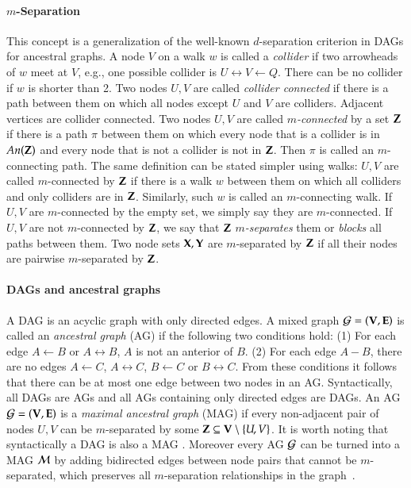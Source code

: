 \paragraph{$m$-Separation} This concept is 
a generalization of the well-known $d$-separation 
criterion in DAGs  \citep{Pearl2009} for ancestral graphs.
A node $V$ on a walk $w$
is called a \emph{collider} if two arrowheads of $w$
meet at $V$, e.g., one possible collider is
$U \leftrightarrow V \gets Q$. There can be no collider
if $w$ is shorter than 2. Two nodes $U,V$ are called
\emph{collider connected} if there is a path between 
them on which all nodes except $U$ and $V$ are 
colliders. Adjacent vertices are collider connected.
Two nodes $U,V$ are 
called \emph{$m$-connected} by a set ${\bf Z}$ if there is a path $\pi$
between them on which every node that is a collider 
is in $\textit{An}({\bf Z})$ and every node that is not a 
collider is not in ${\bf Z}$. Then $\pi$
is called an $m$-connecting path. The same definition
can be stated simpler using walks:
$U,V$ are called $m$-connected by ${\bf Z}$ if 
there is a walk $w$ between them on which all
colliders and only colliders are in ${\bf Z}$.
Similarly, such $w$ is called an $m$-connecting walk.
If $U,V$ are
$m$-connected by the empty set, we simply say they
are $m$-connected.
If $U,V$ are 
not $m$-connected by ${\bf Z}$, we say that ${\bf Z}$ \emph{$m$-separates}
them or \emph{blocks} all paths between them. Two node sets
${\bf X},{\bf Y}$ are $m$-separated by ${\bf Z}$ if all
their nodes are pairwise $m$-separated by ${\bf Z}$.

%
%
%
%
%
%
%
%
%
%
%
%
%
%
%
%
% 


\paragraph{DAGs and ancestral graphs} A DAG is an acyclic graph with only directed  edges.
A mixed graph
${\cal G}=({\bf V},{\bf E})$ is called an \emph{ancestral graph} (AG)  \citep{Richardson2002} if the following two
conditions hold: (1) For each edge $A\gets B$ 
or $A \leftrightarrow B$, $A$ is not an anterior of $B$.
(2) For each edge $A-B$, there are no edges
$A \gets C$, $A \leftrightarrow C$, $B \gets C$ 
or $B \leftrightarrow C$. From these conditions it follows that there can be at most one edge between two nodes in an AG.
Syntactically, all DAGs are AGs and all
AGs containing only directed edges are DAGs.
An AG ${\cal G}=({\bf V},{\bf E})$ is a \emph{maximal ancestral graph}
(MAG) if every non-adjacent pair of nodes $U,V$ 
can be $m$-separated by some ${\bf Z} \subseteq {\bf V} \setminus\{U,V\}$.
It is worth noting that syntactically a DAG is also a MAG \cite{Zhang2008}. 
Moreover every AG ${\cal G}$ can be turned into a MAG ${\cal M}$  by adding
bidirected edges between node pairs that cannot
be $m$-separated, which preserves all $m$-separation
relationships in the graph~\citep[Theorem 5.1]{Richardson2002}. 


